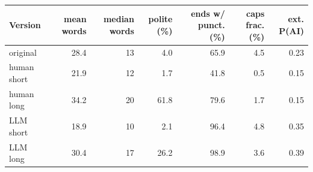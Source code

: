 \begin{tabular}{lrrrrrr}\toprule
Version & mean words & median words & polite (\%) & ends w/ punct. (\%) & caps frac. (\%) & ext. P(AI) \\ \midrule
original & 28.4 & 13 & 4.0 & 65.9 & 4.5 & 0.23 \\
human short & 21.9 & 12 & 1.7 & 41.8 & 0.5 & 0.15 \\
human long & 34.2 & 20 & 61.8 & 79.6 & 1.7 & 0.15 \\
LLM short & 18.9 & 10 & 2.1 & 96.4 & 4.8 & 0.35 \\
LLM long & 30.4 & 17 & 26.2 & 98.9 & 3.6 & 0.39 \\
\bottomrule\end{tabular}